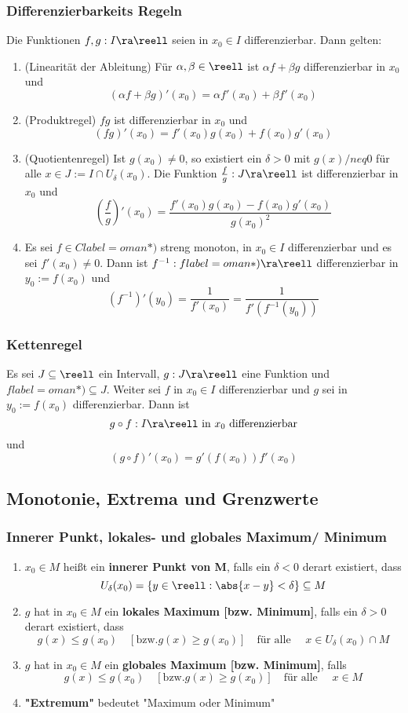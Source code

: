 \documentclass{kit}
\begin{document}
    \subsubsection{Differenzierbarkeits Regeln}
      Die Funktionen $f,g:I\ra\reell$ seien in $x_0\in I$ differenzierbar. Dann gelten:
      \begin{enumerate}
        \item (Linearität der Ableitung) Für $\alpha,\beta\in\reell$ ist $\alpha f+\beta g$ differenzierbar in $x_0$ und
          $$(\alpha f+\beta g)'(x_0)=\alpha f'(x_0)+\beta f'(x_0)$$
        \item (Produktregel) $fg$ ist differenzierbar in $x_0$ und
          $$(fg)'(x_0)=f'(x_0)g(x_0)+f(x_0)g'(x_0)$$
        \item (Quotientenregel) Ist $g(x_0)\neq0$, so existiert ein $\delta>0$ mit $g(x)/neq0$ für alle $x\in J:=I\cap U_\delta(x_0)$. Die Funktion $\frac{f}{g}:J\ra\reell$ ist differenzierbar in $x_0$ und
          $$\left(\frac{f}{g}\right)'(x_0)=\frac{f'(x_0)g(x_0)-f(x_0)g'(x_0)}{g(x_0)^2}$$
        \item Es sei $f\in Clabel=
oman*)$ streng monoton, in $x_0\in I$ differenzierbar und es sei $f'(x_0)\neq0$. Dann ist $f^{-1}:flabel=
oman*)\ra\reell$ differenzierbar in $y_0:=f(x_0)$ und
          $$(f^{-1})'(y_0)=\frac{1}{f'(x_0)}=\frac{1}{f'(f^{-1}(y_0))}$$
      \end{enumerate}
    \subsubsection{Kettenregel}
      Es sei $J\subseteq\reell$ ein Intervall, $g:J\ra\reell$ eine Funktion und $flabel=
oman*)\subseteq J$. Weiter sei $f$ in $x_0\in I$ differenzierbar und $g$ sei in $y_0:=f(x_0)$ differenzierbar. Dann ist
      $$g\circ f:I\ra\reell\text{ in }x_0\text{ differenzierbar}$$
      und
      $$(g\circ f)'(x_0)=g'(f(x_0))f'(x_0)$$
  \subsection{Monotonie, Extrema und Grenzwerte}
    \subsubsection{Innerer Punkt, lokales- und globales Maximum/ Minimum}
      \begin{enumerate}
        \item $x_0\in M$ heißt ein \textbf{innerer Punkt von M}, falls ein $\delta<0$ derart existiert, dass 
          $$U_\delta(x_0)=\{y\in\reell:\abs{x-y}<\delta\}\subseteq M$$
        \item $g$ hat in $x_0\in M$ ein \textbf{lokales Maximum [bzw. Minimum]}, falls ein $\delta>0$ derart existiert, dass
          $$g(x)\le g(x_0)\quad [\text{bzw.} g(x)\ge g(x_0)]\quad\text{für alle }\quad x\in U_\delta(x_0)\cap M$$
        \item $g$ hat in $x_0\in M$ ein \textbf{globales Maximum [bzw. Minimum]}, falls
          $$g(x)\le g(x_0)\quad[\text{bzw.}g(x)\ge g(x_0)]\quad\text{für alle }\quad x\in M$$ 
        \item \textbf{"Extremum"} bedeutet "Maximum oder Minimum"
      \end{enumerate}
\end{document}
